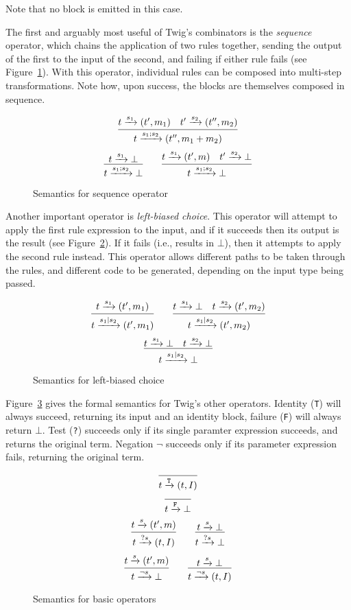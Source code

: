 Note that no block is emitted in this case.

The first and arguably most useful of Twig's combinators is the \emph{sequence} operator, which chains the application of two rules together, sending the output of the first to the input of the second, and failing if either rule fails (see Figure~\ref{fig:seq}). With this operator, individual rules can be composed into multi-step transformations. Note how, upon success, the blocks are themselves composed in sequence.

\begin{figure}[ht]
\label{fig:seq}
\[
\infer
  {t \arr{s_1;s_2} (t'',m_1+m_2)}
  {t \arr{s_1} (t',m_1) \quad t' \arr{s_2} (t'',m_2)}
\]
\[
\infer
  {t \arr{s_1;s_2} \bot}
  {t \arr{s_1} \bot}
\qquad
\infer
  {t \arr{s_1;s_2} \bot}
  {t \arr{s_1} (t',m) \quad t' \arr{s_2} \bot}
\]
\caption{Semantics for sequence operator}
\end{figure}

Another important operator is \emph{left-biased choice}. This operator will attempt to apply the first rule expression to the input, and if it succeeds then its output is the result (see Figure~\ref{fig:choice}). If it fails (i.e., results in $\bot$), then it attempts to apply the second rule instead. This operator allows different paths to be taken through the rules, and different code to be generated, depending on the input type being passed.

\begin{figure}[ht]
\label{fig:choice}
\[
\infer
  {t \arr{s_1|s_2} (t',m_1)}
  {t \arr{s_1} (t',m_1)}
\qquad
\infer
  {t \arr{s_1|s_2} (t',m_2)}
  {t \arr{s_1} \bot \quad t \arr{s_2} (t',m_2)}
\]
\[
\infer
  {t \arr{s_1|s_2} \bot}
  {t \arr{s_1} \bot \quad t \arr{s_2} \bot}
\]
\caption{Semantics for left-biased choice}
\end{figure}

Figure~\ref{fig:basic} gives the formal semantics for Twig's other operators. Identity (\texttt{T}) will always succeed, returning its input and an identity block, failure (\texttt{F}) will always return \texttt{$\bot$}. Test (\texttt{?}) succeeds only if its single paramter expression succeeds, and returns the original term. Negation \texttt{$\lnot$} succeeds only if its parameter expression fails, returning the original term.

\begin{figure}[ht]
\label{fig:basic}
\[
\infer
  {t \arr{\mathtt{T}} (t,I)}
  {}
\]
\[
\infer
  {t \arr{\mathtt{F}} \bot}
  {}
\]
\[
\infer
  {t \arr{?s} (t,I)}
  {t \arr{s} (t',m)}
\qquad 
\infer
  {t \arr{?s} \bot}
  {t \arr{s} \bot}
\]
\[
\infer
  {t \arr{\lnot s} \bot}
  {t \arr{s} (t',m)}
\qquad 
\infer
  {t \arr{\lnot s} (t,I)}
  {t \arr{s} \bot}
\]
\caption{Semantics for basic operators}
\end{figure}

